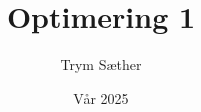 \documentclass[10pt, a4paper]{report}
\begin{document}
\title{Optimering 1}

\author{Trym Sæther}

\date{Vår 2025}

\maketitle

\tableofcontents

\clearpage





\clearpage

\appendix




\printbibliography
\end{document}
